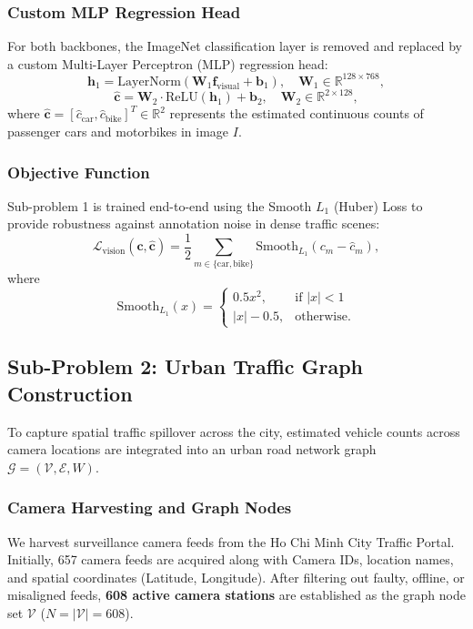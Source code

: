 \subsubsection{Custom MLP Regression Head}
For both backbones, the ImageNet classification layer is removed and replaced by a custom Multi-Layer Perceptron (MLP) regression head:
\begin{equation}
\mathbf{h}_1 = \text{LayerNorm}\left( \mathbf{W}_1 \mathbf{f}_{\text{visual}} + \mathbf{b}_1 \right), \quad \mathbf{W}_1 \in \mathbb{R}^{128 \times 768},
\end{equation}
\begin{equation}
\hat{\mathbf{c}} = \mathbf{W}_2 \cdot \text{ReLU}(\mathbf{h}_1) + \mathbf{b}_2, \quad \mathbf{W}_2 \in \mathbb{R}^{2 \times 128},
\end{equation}
where $\hat{\mathbf{c}} = [\hat{c}_{\text{car}}, \hat{c}_{\text{bike}}]^T \in \mathbb{R}^2$ represents the estimated continuous counts of passenger cars and motorbikes in image $I$.

\subsubsection{Objective Function}
Sub-problem 1 is trained end-to-end using the Smooth $L_1$ (Huber) Loss \cite{huber} to provide robustness against annotation noise in dense traffic scenes:
\begin{equation}
\mathcal{L}_{\text{vision}}(\mathbf{c}, \hat{\mathbf{c}}) = \frac{1}{2} \sum_{m \in \{\text{car}, \text{bike}\}} \text{Smooth}_{L_1}\left(c_m - \hat{c}_m\right),
\end{equation}
where
\begin{equation}
\text{Smooth}_{L_1}(x) = \begin{cases} 0.5 x^2, & \text{if } |x| < 1 \\ |x| - 0.5, & \text{otherwise.} \end{cases}
\end{equation}

\subsection{Sub-Problem 2: Urban Traffic Graph Construction}

To capture spatial traffic spillover across the city, estimated vehicle counts across camera locations are integrated into an urban road network graph $\mathcal{G} = (\mathcal{V}, \mathcal{E}, W)$.

\subsubsection{Camera Harvesting and Graph Nodes}
We harvest surveillance camera feeds from the Ho Chi Minh City Traffic Portal. Initially, 657 camera feeds are acquired along with Camera IDs, location names, and spatial coordinates (Latitude, Longitude). After filtering out faulty, offline, or misaligned feeds, \textbf{608 active camera stations} are established as the graph node set $\mathcal{V}$ ($N = |\mathcal{V}| = 608$).

